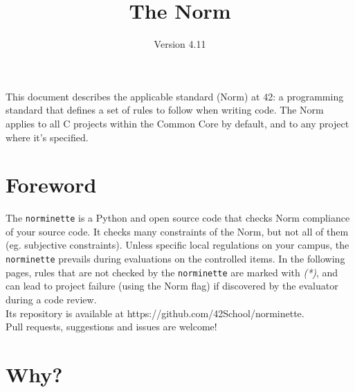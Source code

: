 \documentclass{42-en}
\begin{document}
\title{The Norm}
\subtitle{Version 4.11}

\summary
{
    This document describes the applicable standard (Norm) at 42: a
    programming standard that defines a set of rules to follow when writing code.
    The Norm applies to all C projects within the Common Core by default, and
    to any project where it's specified.
}

\maketitle

\tableofcontents



\chapter{Foreword}

The \texttt{norminette} is a Python and open source code that checks Norm
compliance of your source code. It checks many constraints of the Norm, but not
all of them (eg. subjective constraints). Unless specific local regulations on
your campus, the \texttt{norminette} prevails during evaluations on the controlled
items. In the following pages, rules that are not checked by the \texttt{norminette}
are marked with \textit{(*)}, and can lead to project failure (using the Norm flag) if
discovered by the evaluator during a code review.\\

Its repository is available at https://github.com/42School/norminette.\\

Pull requests, suggestions and issues are welcome!

\newpage


%
%
    \chapter{Why?}
\end{document}
